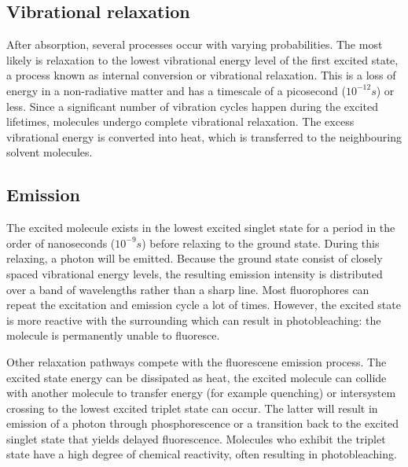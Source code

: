 \documentclass[twoside,single]{lion-msc}
\begin{document}
\subsection{Vibrational relaxation}
After absorption, several processes occur with varying probabilities. The most likely is relaxation to the lowest vibrational energy level of the first excited state, a process known as internal conversion or vibrational relaxation. This is a loss of energy in a non-radiative matter and has a timescale of a picosecond ($10^{-12}s$) or less. Since a significant number of vibration cycles happen during the excited lifetimes, molecules undergo complete vibrational relaxation. The excess vibrational energy is converted into heat, which is transferred to the neighbouring solvent molecules.

\subsection{Emission}
The excited molecule exists in the lowest excited singlet state for a period in the order of nanoseconds ($10^{-9}s$) before relaxing to the ground state. During this relaxing, a photon will be emitted. Because the ground state consist of closely spaced vibrational energy levels, the resulting emission intensity is distributed over a band of wavelengths rather than a sharp line. Most fluorophores can repeat the excitation and emission cycle a lot of times. However, the excited state is more reactive with the surrounding which can result in photobleaching: the molecule is permanently unable to fluoresce. 

Other relaxation pathways compete with the fluorescene emission process. The excited state energy can be dissipated as heat, the excited molecule can collide with another molecule to transfer energy (for example quenching) or intersystem crossing to the lowest excited triplet state can occur. The latter will result in emission of a photon through phosphorescence or a transition back to the excited singlet state that yields delayed fluorescence. Molecules who exhibit the triplet state have a high degree of chemical reactivity, often resulting in photobleaching. 
\end{document}
